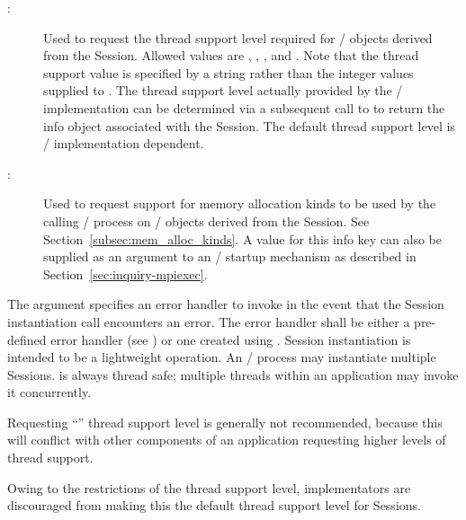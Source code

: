 \begin{description}
\item[:] Used to request the thread support level required for \MPI/ objects
derived from the Session.  Allowed values are , , , and .  Note that the thread support value is specified by a string rather than the integer
values supplied to .  The thread support level actually provided by the \MPI/ implementation
can be determined via a subsequent call to  to return the info object associated with
the Session.  The default thread support level is \MPI/ implementation dependent.
\item[:]
Used to request support for memory allocation kinds to be used by the calling \MPI/ process on \MPI/ objects derived from the Session.
See Section~\ref{subsec:mem_alloc_kinds}.
A value for this info key can also be supplied as an argument to an \MPI/ startup mechanism as described in Section~\ref{sec:inquiry-mpiexec}.
\end{description}

The  argument specifies an error handler to invoke in the event that the
Session instantiation call encounters an error.
The error handler shall be either a pre-defined error handler (see )
or one created using .
Session instantiation is intended to be a lightweight operation.
An \MPI/ process may instantiate multiple Sessions.  is always thread safe; multiple threads
within an application may invoke it concurrently.

\begin{users}
Requesting ``'' thread support level is generally not recommended, because this will conflict with other components of an application requesting higher levels of thread support.
\end{users}

\begin{implementors}
Owing to the restrictions of the  thread support level, implementators are discouraged from making this the default thread support level for Sessions.
\end{implementors}


